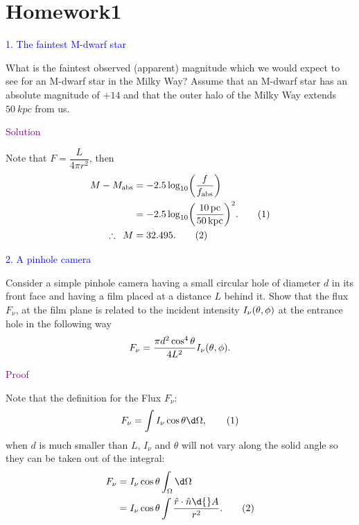 \documentclass[UTF8, 12pt, a4paper, oneside, twocolumn, fontset=none]{ctexart}
\begin{document}
\section*{Homework1}

\hspace*{\fill}

\noindent\textcolor{blue}{1. The faintest M-dwarf star}

\noindent What is the faintest observed (apparent) magnitude which we would expect to see for an M-dwarf star in the Milky Way? Assume that an M-dwarf star has an absolute magnitude of $+14$ and that the outer halo of the Milky Way extends $\qty{50}{kpc}$ from us.

\hspace*{\fill}

\noindent\textcolor{purple}{Solution}

Note that $F=\dfrac{L}{4\pi{}r^{2}}$, then
\begin{align}
M-M_{\mathrm{abs}}&=-2.5\log_{10}\mleft(\frac{f}{f_{\mathrm{abs}}}\mright)\notag\\
&=-2.5\log_{10}\mleft(\frac{\qty{10}{pc}}{\qty{50}{kpc}}\mright)^{2}.\tag{1}\\
\therefore\enspace{}M&=32.495.\tag{2}
\end{align}

\hspace*{\fill}

\noindent\textcolor{blue}{2. A pinhole camera}

\noindent Consider a simple pinhole camera having a small circular hole of diameter $d$ in its front face and having a film placed at a distance $L$ behind it. Show that the flux $F_{\nu}$, at the film plane is related to the incident intensity $I_{\nu}\mleft(\theta,\phi\mright)$ at the entrance hole in the following way
\begin{equation}
F_{\nu}=\frac{\pi{}d^{2}\cos^{4}{\theta}}{4L^{2}}I_{\nu}\mleft(\theta,\phi\mright).\notag
\end{equation}

\hspace*{\fill}

\noindent\textcolor{purple}{Proof}

Note that the definition for the Flux $F_{\nu}$:
\begin{equation}
F_{\nu}=\int{}I_{\nu}\cos{\theta}\d\Omega,\tag{1}
\end{equation}
when $d$ is much smaller than $L$, $I_{\nu}$ and $\theta$ will not vary along the solid angle so they can be taken out of the integral:
\begin{align}
F_{\nu}&=I_{\nu}\cos{\theta}\int_{\Omega}\d\Omega\notag\\
&=I_{\nu}\cos{\theta}\int\frac{\hat{r}\cdot{}\hat{n}\d{}A}{r^{2}}.\tag{2}
\end{align}
\end{document}
